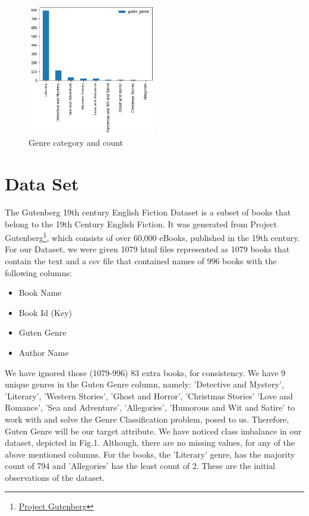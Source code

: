 \documentclass[conference]{IEEEtran}
\begin{document}
\begin{figure}
\centering
\includegraphics[width = 0.5\textwidth]{Classimbalance.png}
\caption{\label{fig:frog}Genre category and count}
\end{figure}

\section{Data Set}
\justify
The Gutenberg 19th century English Fiction Dataset is a subset of books that belong to the 19th Century English Fiction. \newline It was generated from Project Gutenberg\footnote[1]{\href{https://www.gutenberg.org/}{Project Gutenberg}}, which consists of over 60,000 eBooks, published in the 19th century. For our Dataset, we were given 1079 html files represented as 1079 books that contain the text   and a csv file that contained names of 996 books with the following columns:
\begin{itemize}
  \item Book Name
  \item Book Id (Key)
  \item Guten Genre
  \item Author Name
\end{itemize}\vspace{1mm}
\newpage \justify We have ignored those (1079-996) 83 extra books, for \newline consistency. We have 9 unique genres in the Guten Genre column, namely: 'Detective and Mystery', 'Literary', 'Western Stories', 'Ghost and Horror', 'Christmas Stories' 'Love and Romance', 'Sea and Adventure', 'Allegories', 'Humorous and Wit and Satire' to work with and solve the Genre Classification problem, posed to us. Therefore, Guten Genre will be our target attribute.
We have noticed class imbalance in our dataset, depicted in Fig.1. Although, there are no missing values, for any of the above mentioned columns. For the books, the 'Literary' genre, has the majority count of 794 and 'Allegories' has the least count of 2. These are the initial observations of the dataset.
\end{document}
